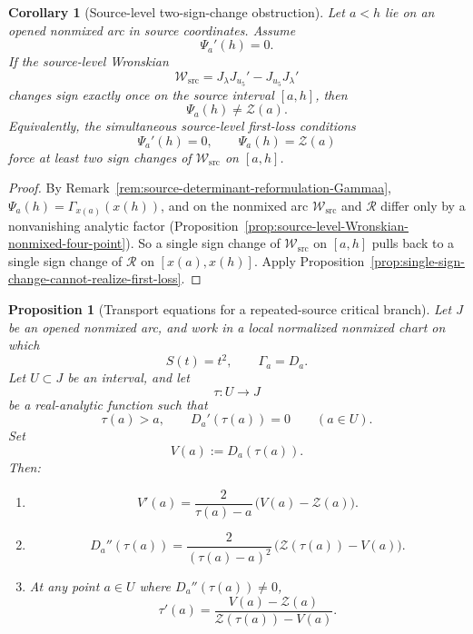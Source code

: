 \documentclass[11pt,a4paper]{amsart}
\theoremstyle{plain}
\newtheorem{proposition}[theorem]{Proposition}
\newtheorem{corollary}[theorem]{Corollary}
\theoremstyle{definition}
\begin{document}
\begin{corollary}[Source-level two-sign-change obstruction]
\label{cor:source-level-two-sign-change-obstruction}
Let $a<h$ lie on an opened nonmixed arc in source coordinates.
Assume
\[
\Psi_a'(h)=0.
\]
If the source-level Wronskian
\[
\mathcal W_{\mathrm{src}}
=
J_\lambda J_{u_5}'-J_{u_5}J_\lambda'
\]
changes sign exactly once on the source interval $[a,h]$, then
\[
\Psi_a(h)\neq \mathcal Z(a).
\]
Equivalently, the simultaneous source-level first-loss conditions
\[
\Psi_a'(h)=0,
\qquad
\Psi_a(h)=\mathcal Z(a)
\]
force at least two sign changes of $\mathcal W_{\mathrm{src}}$ on $[a,h]$.
\end{corollary}

\begin{proof}
By Remark~\ref{rem:source-determinant-reformulation-Gammaa},
$\Psi_a(h)=\Gamma_{x(a)}(x(h))$, and on the nonmixed arc
$\mathcal W_{\mathrm{src}}$ and $\mathcal R$ differ only by a nonvanishing
analytic factor
(Proposition~\ref{prop:source-level-Wronskian-nonmixed-four-point}). So a
single sign change of $\mathcal W_{\mathrm{src}}$ on $[a,h]$ pulls back to a
single sign change of $\mathcal R$ on $[x(a),x(h)]$. Apply
Proposition~\ref{prop:single-sign-change-cannot-realize-first-loss}.
\end{proof}

\begin{proposition}[Transport equations for a repeated-source critical branch]
\label{prop:transport-equations-repeated-source-critical-branch}
Let $J$ be an opened nonmixed arc, and work in a local normalized nonmixed
chart on which
\[
S(t)=t^2,
\qquad
\Gamma_a=D_a.
\]
Let $U\subset J$ be an interval, and let
\[
\tau:U\to J
\]
be a real-analytic function such that
\[
\tau(a)>a,
\qquad
D_a'(\tau(a))=0
\qquad (a\in U).
\]
Set
\[
V(a):=D_a(\tau(a)).
\]
Then:
\begin{enumerate}
\item
\[
V'(a)=\frac{2}{\tau(a)-a}\,\bigl(V(a)-\mathcal Z(a)\bigr).
\]

\item
\[
D_a''(\tau(a))
=
\frac{2}{(\tau(a)-a)^2}\,\bigl(\mathcal Z(\tau(a))-V(a)\bigr).
\]

\item
At any point $a\in U$ where $D_a''(\tau(a))\neq 0$,
\[
\tau'(a)
=
\frac{V(a)-\mathcal Z(a)}
{\mathcal Z(\tau(a))-V(a)}.
\]
\end{enumerate}
\end{proposition}
\end{document}
